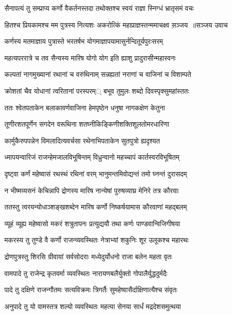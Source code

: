\twolineshloka
{सैनापत्यं तु सम्प्राप्य कर्णो वैकर्तनस्तदा}
{तथोक्तश्च स्वयं राज्ञा स्निग्धं भ्रातृसमं वचः}


\threelineshloka
{हितश्च प्रियकामश्च मम पुत्रस्य नित्यशः}
{अकरोत्किं महाप्राज्ञस्तन्ममाचक्ष्व स़ञ्जय ॥सञ्जय उवाच}
{}


\twolineshloka
{कर्णस्य मतमाज्ञाय पुत्रास्ते भरतर्षभ}
{योगमाज्ञापयामासुर्नन्दितूर्यपुरःसरम्}


\twolineshloka
{महत्यपररात्रे च तव सैन्यस्य मारिष}
{योगो योग इति ह्याशु प्रादुरासीन्महास्वनः}


\twolineshloka
{कल्पतां नागमुख्यानां रथानां च वरुथिनाम्}
{सन्नह्यतां नराणां च वाजिनां च विशाम्पते}


\twolineshloka
{क्रोशतां चैव योधानां त्वरितानां परस्परम््}
{बभूव तुमुलः शब्दो दिवस्पृक्सुमहांस्ततः}


\twolineshloka
{ततः श्वेतपताकेन बलाकावर्णवाजिना}
{हेमपृष्ठेन धनुषा नागकक्षेण केतुना}


\twolineshloka
{तूणीरशतपूर्णेन सगदेन वरूथिना}
{शतघ्नीकिङ्किणीशक्तिशूलतोमरधारिणा}


\twolineshloka
{कार्मुकैरुपपन्नेन विमलादित्यवर्चसा}
{रथेनाभिपताकेन सुतपुत्रो ह्यदृश्यत}


\twolineshloka
{ध्मापयन्वारिजं राजन्हेमजालविभूषिन्तम्}
{विध्रुन्वानो महच्चापं कार्तस्वरविभूषितम्}


\twolineshloka
{दृष्ट्वा कर्णं महेष्वासं रथस्थं रथिनां वरम्}
{भानुमन्तमिवोद्यन्तं तमो घ्नन्तं दुरासदम्}


\twolineshloka
{न भीष्मव्यसनं केचिन्नापि द्रोणस्य मारिष}
{नान्येषां पुरुषव्याघ्र मेनिरे तत्र कौरवाः}


\twolineshloka
{ततस्तु त्वरयन्योधाञ्शङ्खशब्देन मारिष}
{कर्णो निष्कर्षयामास कौरवाणां महद्बलम्}


\twolineshloka
{व्यूहं व्यूह्य महेष्वासो मकरं शत्रुतापनः}
{प्रत्युद्ययौ तथा कर्णः पाण्डवान्विजिगीषया}


\twolineshloka
{मकरस्य तु तुण्डे वै कर्णो राजन्व्यवस्थितः}
{नेत्राभ्यां शकुनिः शूर उलूकश्च महारथः}


\twolineshloka
{द्रोणपुत्रस्तु शिरसि ग्रीवायां सर्वसोदराः}
{मध्येदुर्योधनो राजा बलेन महता वृतः}


\twolineshloka
{वामपादे तु राजेन्द्र कृतवर्मा व्यवस्थितः}
{नारायणबलैर्युक्तो गोपालैर्युद्धदुर्मदैः}


\twolineshloka
{पादे तु दक्षिणे राजन्गौतमः सत्यविक्रमः}
{त्रिगर्तैः सुमहेष्वासैर्दाक्षिणात्यैश्च संवृतः}


\twolineshloka
{अनुपादे तु यो वामस्तत्र शल्यो व्यवस्थितः}
{महत्या सेनया सार्धं मद्रदेशसमुत्थया}


